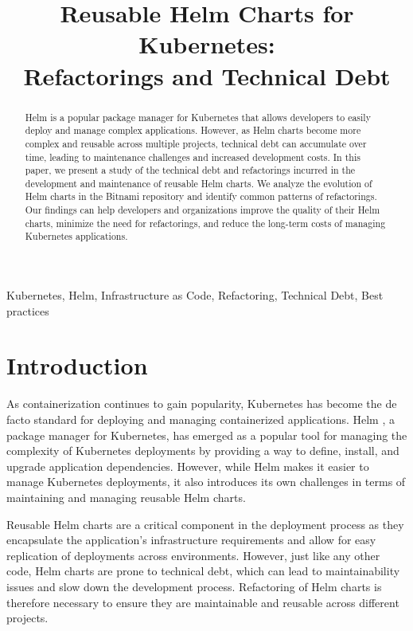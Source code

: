 \documentclass[conference]{IEEEtran}
\title{
    Reusable Helm Charts for Kubernetes:\\
    Refactorings and Technical Debt
}
\author{
    \IEEEauthorblockN{Nam Vu}
    \IEEEauthorblockA{
        \textit{Dept. of Software Engineering} \\
        \textit{Polytechnique Montréal}\\
        Montreal, Canada \\
        nam.vu@polymtl.ca}
}
\begin{document}
\maketitle

\begin{abstract}
    Helm is a popular package manager for Kubernetes that allows developers to easily deploy and manage complex applications. However, as Helm charts become more complex and reusable across multiple projects, technical debt can accumulate over time, leading to maintenance challenges and increased development costs. In this paper, we present a study of the technical debt and refactorings incurred in the development and maintenance of reusable Helm charts. We analyze the evolution of Helm charts in the Bitnami repository and identify common patterns of refactorings. Our findings can help developers and organizations improve the quality of their Helm charts, minimize the need for refactorings, and reduce the long-term costs of managing Kubernetes applications.
\end{abstract}

\begin{IEEEkeywords}
    Kubernetes, Helm, Infrastructure as Code, Refactoring, Technical Debt, Best practices
\end{IEEEkeywords}

\section{Introduction}

As containerization continues to gain popularity, Kubernetes \cite{kubernetes} has become the de facto standard for deploying and managing containerized applications. Helm \cite{helm}, a package manager for Kubernetes, has emerged as a popular tool for managing the complexity of Kubernetes deployments by providing a way to define, install, and upgrade application dependencies. However, while Helm makes it easier to manage Kubernetes deployments, it also introduces its own challenges in terms of maintaining and managing reusable Helm charts.

Reusable Helm charts are a critical component in the deployment process as they encapsulate the application's infrastructure requirements and allow for easy replication of deployments across environments. However, just like any other code, Helm charts are prone to technical debt, which can lead to maintainability issues and slow down the development process. Refactoring of Helm charts is therefore necessary to ensure they are maintainable and reusable across different projects.
\end{document}
